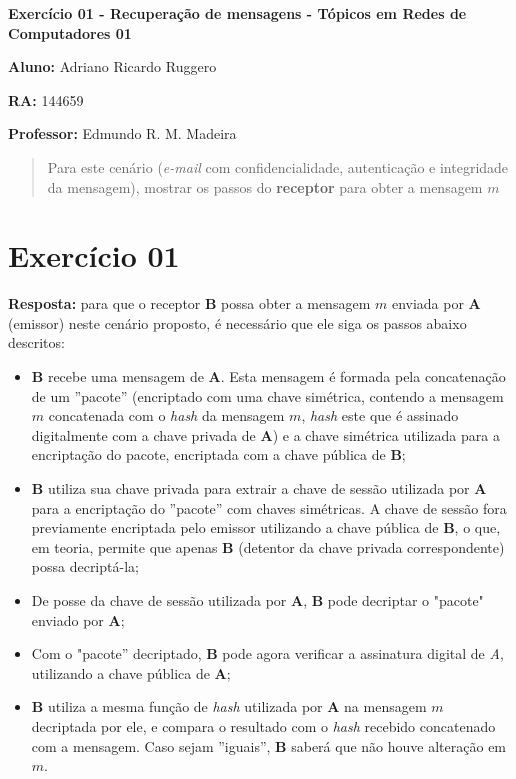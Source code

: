 \documentclass[12pt,twoside,a4paper]{article}
\begin{document}
\vskip 15mm

\begin{center} 
\textbf{Exercício 01 - Recuperação de mensagens - Tópicos em Redes de Computadores 01}

\end{center}

\vskip 5mm

\textbf{Aluno:} Adriano Ricardo Ruggero

\textbf{RA:} 144659

\textbf{Professor:} Edmundo R. M. Madeira

\vskip 20mm

\begin{abstract}
Para este cenário (\textit{e-mail} com confidencialidade, autenticação e integridade da mensagem), mostrar os passos do \textbf{receptor} para obter a mensagem $m$

\end{abstract}

\newpage
\pagestyle{plain}
\headheight 0.0cm
\headsep 0.0cm
\footskip 2.2cm

\section{Exercício 01}
\label{sec:01}

\textbf{Resposta:} para que o receptor \textbf{B} possa obter a mensagem $m$ enviada por \textbf{A} (emissor) neste cenário proposto, é necessário que ele siga os passos abaixo descritos:

\begin{itemize}

    \item \textbf{B} recebe uma mensagem de \textbf{A}. Esta mensagem é formada pela concatenação de um ''pacote'' (encriptado com uma chave simétrica,  contendo a mensagem $m$ concatenada com o \textit{hash} da mensagem $m$, \textit{hash} este que é assinado digitalmente com a chave privada de \textbf{A}) e a chave simétrica utilizada para a encriptação do pacote, encriptada com a chave pública de \textbf{B};
    \item \textbf{B} utiliza sua chave privada para extrair a chave de sessão utilizada por \textbf{A} para a encriptação do ''pacote'' com chaves simétricas. A chave de sessão fora previamente encriptada pelo emissor utilizando a chave pública de \textbf{B}, o que, em teoria, permite que apenas \textbf{B} (detentor da chave privada correspondente) possa decriptá-la;
    \item De posse da chave de sessão utilizada por \textbf{A}, \textbf{B} pode decriptar o "pacote" enviado por \textbf{A};
    \item Com o "pacote'' decriptado, \textbf{B} pode agora verificar a assinatura digital de \textit{A}, utilizando a chave pública de \textbf{A};
    \item \textbf{B} utiliza a mesma função de \textit{hash} utilizada por \textbf{A} na mensagem $m$ decriptada por ele, e compara o resultado com o \textit{hash} recebido concatenado com a mensagem. Caso sejam ''iguais'', \textbf{B} saberá que não houve alteração em $m$.

\end{itemize}
\end{document}
